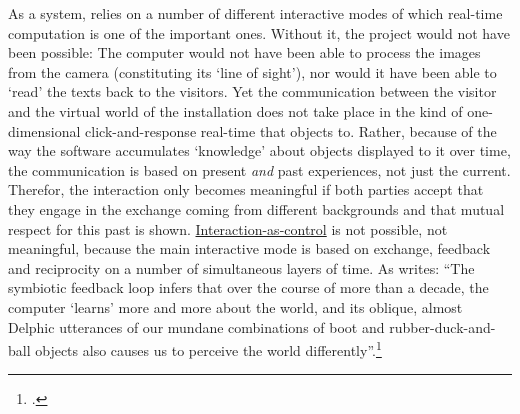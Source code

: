 As a system,  relies on a number of different interactive modes of which real-time computation is one of the important ones. Without it, the project would not have been possible: The computer would not have been able to process the images from the camera (constituting its `line of sight'), nor would it have been able to `read' the texts back to the visitors. Yet the communication between the visitor and the virtual world of the installation does not take place in the kind of one-dimensional click-and-response real-time that \citeauthor{baudrillard02} objects to. Rather, because of the way the software accumulates `knowledge' about objects displayed to it over time, the communication is based on present \emph{and} past experiences, not just the current. Therefor, the interaction only becomes meaningful if both parties accept that they engage in the exchange coming from different backgrounds and that mutual respect for this past is shown. \hyperlink{sec:inter-defin:par4}{Interaction-as-control} is not possible, not meaningful, because the main interactive mode is based on exchange, feedback and reciprocity on a number of simultaneous layers of time. As \citeauthor{dietz02} writes: ``The symbiotic feedback loop infers that over the course of more than a decade, the computer `learns' more and more about the world, and its oblique, almost Delphic utterances of our mundane combinations of boot and rubber-duck-and-ball objects also causes us to perceive the world differently''.\footcite{dietz02}

